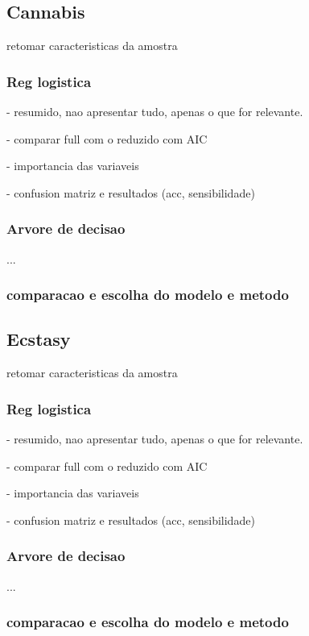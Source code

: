 \documentclass[
	article,			%
	11pt,				%
	oneside,			%
	a4paper,			%
	english,			%
	brazil,				%
	sumario=tradicional
	]{abntex2}
\begin{document}
\subsection{Cannabis}

retomar caracteristicas da amostra

\subsubsection{Reg logistica}

- resumido, nao apresentar tudo, apenas o que for relevante.

- comparar full com o reduzido com AIC

- importancia das variaveis

- confusion matriz e resultados (acc, sensibilidade)

\subsubsection{Arvore de decisao}

... 

\subsubsection{comparacao e escolha do modelo e metodo}

\subsection{Ecstasy}

retomar caracteristicas da amostra

\subsubsection{Reg logistica}

- resumido, nao apresentar tudo, apenas o que for relevante.

- comparar full com o reduzido com AIC

- importancia das variaveis

- confusion matriz e resultados (acc, sensibilidade)

\subsubsection{Arvore de decisao}

... 

\subsubsection{comparacao e escolha do modelo e metodo}
\end{document}
